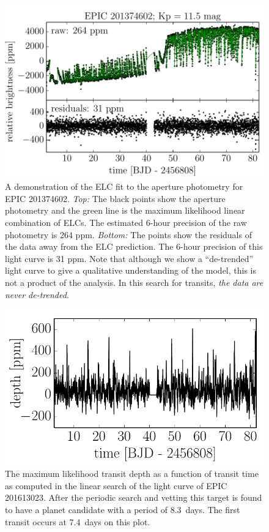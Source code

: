 \documentclass[12pt,preprint]{aastex}
\newcommand{\figlabel}[1]{\label{fig:#1}}
\begin{document}
\begin{figure}[p]
\begin{center}
\includegraphics{figures/corr.pdf}
\end{center}
\caption{%
A demonstration of the ELC fit to the aperture photometry for EPIC 201374602.
\emph{Top:} The black points show the aperture photometry and the green line
is the maximum likelihood linear combination of ELCs.
The estimated 6-hour precision of the raw photometry is 264 ppm.
\emph{Bottom:} The points show the residuals of the data away from the ELC
prediction.
The 6-hour precision of this light curve is 31 ppm.
Note that although we show a ``de-trended'' light curve to give a qualitative
understanding of the model, this is not a product of the analysis.
In this search for transits, \emph{the data are never de-trended}.
\figlabel{corr}}
\end{figure}

\begin{figure}[p]
\begin{center}
\includegraphics{figures/linear.pdf}
\end{center}
\caption{%
The maximum likelihood transit depth as a function of transit time as computed
in the linear search of the light curve of EPIC 201613023.
After the periodic search and vetting this target is found to have a planet
candidate with a period of 8.3~days.
The first transit occurs at 7.4~days on this plot.
\figlabel{linear}}
\end{figure}
\end{document}
